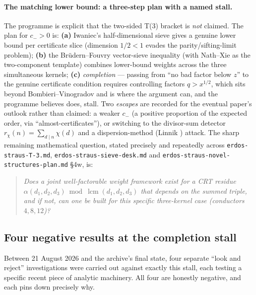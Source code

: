 \documentclass[11pt]{article}
\theoremstyle{plain}
\theoremstyle{definition}
\theoremstyle{remark}
\newcommand{\file}[1]{\texttt{#1}}
\renewcommand{\_}{\textunderscore\allowbreak}
\begin{document}
\paragraph{The matching lower bound: a three-step plan with a named stall.}
The programme is explicit that the two-sided T(3) bracket is \emph{not} claimed. The plan for
$c_->0$ is: \textbf{(a)} Iwaniec's half-dimensional sieve \cite{Iwaniec1976} gives a genuine
lower bound per certificate slice (dimension $1/2<1$ evades the parity/sifting-limit problem);
\textbf{(b)} the Br\"udern--Fouvry vector-sieve inequality \cite{BrudernFouvry1994,BrudernFouvry1996}
(with Nath--Xie \cite{NathXie2025} as the two-component template) combines lower-bound weights
across the three simultaneous kernels; \textbf{(c)} \emph{completion} — passing from ``no bad
factor below $z$'' to the genuine certificate condition requires controlling factors
$q>x^{1/2}$, which sits beyond Bombieri--Vinogradov and is where the argument can, and the
programme believes does, stall. Two \emph{escapes} are recorded for the eventual paper's
outlook rather than claimed: a weaker $c_-$ (a positive proportion of the expected order, via
``almost-certificates''), or switching to the divisor-sum detector
$r_\chi(n)=\sum_{d\mid n}\chi(d)$ and a dispersion-method (Linnik \cite{Linnik1960}) attack. The
sharp remaining mathematical question, stated precisely and repeatedly across
\file{erdos-straus-T-3.md}, \texttt{erdos-\allowbreak straus-\allowbreak sieve-\allowbreak desk.md} and
\texttt{erdos-\allowbreak straus-\allowbreak novel-\allowbreak structures-\allowbreak plan.md} \S4w, is:
\begin{quote}\itshape
Does a joint well-factorable weight framework exist for a CRT residue
$\alpha(d_1,d_2,d_3)\bmod\operatorname{lcm}(d_1,d_2,d_3)$ that depends on the summed triple, and
if not, can one be built for this specific three-kernel case (conductors $4,8,12$)?
\end{quote}

\subsection{Four negative results at the completion stall}
\label{subsec:t3-negative}

Between 21 August 2026 and the archive's final state, four separate ``look and reject''
investigations were carried out against exactly this stall, each testing a specific recent piece
of analytic machinery. All four are honestly negative, and each pins down precisely why.
\end{document}
